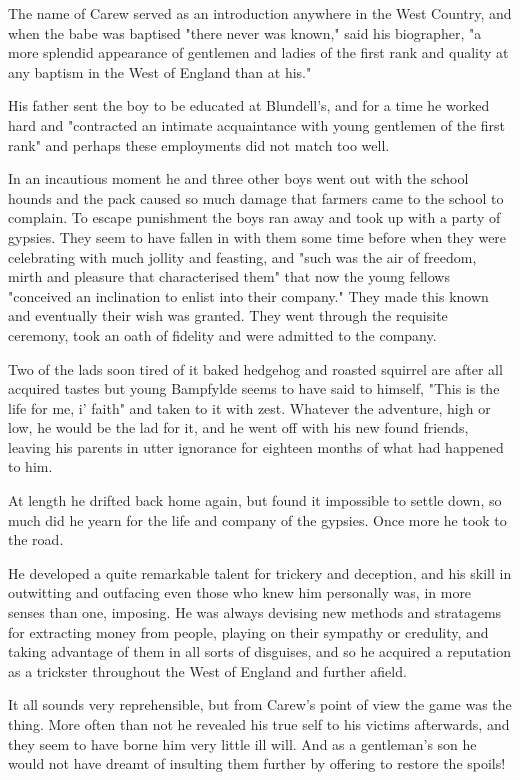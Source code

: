 The name of Carew served as an introduction anywhere in the West Country, and when the babe was baptised "there never was known," said his biographer, "a more splendid appearance of gentlemen and ladies of the first rank and quality at any baptism in the West of England than at his."

His father sent the boy to be educated at Blundell's, and for a time he worked hard and "contracted an intimate acquaintance with young gentlemen of the first rank"   and perhaps these employments did not match too well.

In an incautious moment he and three other boys went out with the school hounds and the pack caused so much damage that farmers came to the school to complain. To escape punishment the boys ran away and took up with a party of gypsies. They seem to have fallen in with them some time before when they were celebrating with much jollity and feasting, and "such was the air of freedom, mirth and pleasure that characterised them" that now the young fellows "conceived an inclination to enlist into their company."
They made this known and eventually their wish was granted. They went through the requisite ceremony, took an oath of fidelity and were admitted to the company.

Two of the lads soon tired of it   baked hedgehog and roasted squirrel are after all acquired tastes   but young Bampfylde seems to have said to himself, "This is the life for me, i’ faith" and taken to it with zest. Whatever the adventure, high or low, he would be the lad for it, and he went off with his new found friends, leaving his parents in utter ignorance for eighteen months of what had happened to him.

At length he drifted back home again, but found it impossible to settle down, so much did he yearn for the life and company of the gypsies. Once more he took to the road.

He developed a quite remarkable talent for trickery and deception, and his skill in outwitting and outfacing even those who knew him personally was, in more senses than one, imposing. He was always devising new methods and stratagems for extracting money from people, playing on their sympathy or credulity, and taking advantage of them in all sorts of disguises, and so he acquired a reputation as a trickster throughout the West of England and further afield.

It all sounds very reprehensible, but from Carew's point of view the game was the thing. More often than not he revealed his true self to his victims afterwards, and they seem to have borne him very little ill will. And as a gentleman's son he would not have dreamt of insulting them further by offering to restore the spoils!

